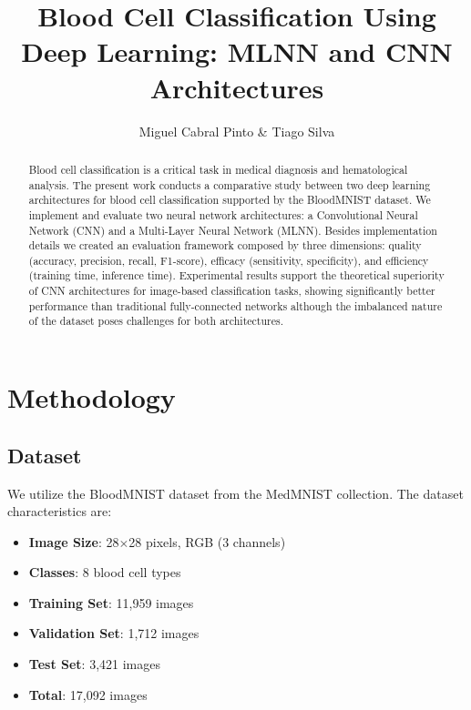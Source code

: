 \documentclass[runningheads]{llncs}
\begin{document}
\title{Blood Cell Classification Using Deep Learning: MLNN and CNN Architectures}
\author{Miguel Cabral Pinto \& Tiago Silva}


\maketitle

\begin{abstract}
Blood cell classification is a critical task in medical diagnosis and hematological analysis. 
The present work conducts a comparative study between two deep learning architectures for blood cell
classification supported by the BloodMNIST dataset. We implement and evaluate two neural network 
architectures: a Convolutional Neural Network (CNN) and a Multi-Layer Neural Network (MLNN). 
Besides implementation details we created an evaluation framework composed by three dimensions:
quality (accuracy, precision, recall, F1-score), efficacy (sensitivity, specificity), 
and efficiency (training time, inference time). Experimental results support the theoretical
superiority of CNN architectures for image-based classification tasks, showing
significantly better performance than traditional fully-connected networks although the imbalanced
nature of the dataset poses challenges for both architectures.

\end{abstract}

\section{Methodology}
\subsection{Dataset}

We utilize the BloodMNIST dataset from the MedMNIST collection. The dataset characteristics are:

\begin{itemize}
    \item \textbf{Image Size}: 28$\times$28 pixels, RGB (3 channels)
    \item \textbf{Classes}: 8 blood cell types
    \item \textbf{Training Set}: 11,959 images
    \item \textbf{Validation Set}: 1,712 images
    \item \textbf{Test Set}: 3,421 images
    \item \textbf{Total}: 17,092 images
\end{itemize}
\end{document}
